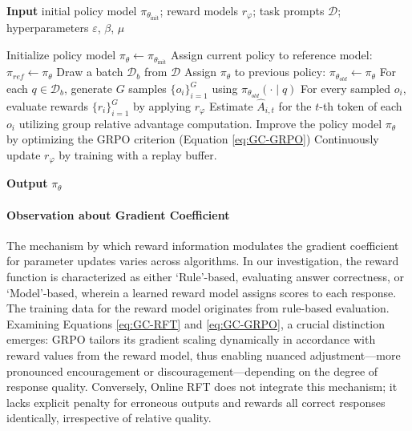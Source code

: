 \begin{algorithm}[t]
  \small
  \caption{Iterative Group Relative Policy Optimization}
  \textbf{Input} initial policy model $\pi_{\theta_{\text{init}}}$; reward models $r_\varphi$; task prompts $\mathcal{D}$; 
  hyperparameters $\varepsilon$, $\beta$, $\mu$
  \begin{algorithmic}[1]
    \State Initialize policy model $\pi_\theta \leftarrow \pi_{\theta_{\text{init}}}$
       \State Assign current policy to reference model: $\pi_{ref} \leftarrow \pi_{\theta}$
      \State Draw a batch $\mathcal{D}_b$ from $\mathcal{D}$
      \State Assign $\pi_{\theta}$ to previous policy: $\pi_{\theta_{old}} \leftarrow \pi_{\theta}$ 
      \State For each $q \in \mathcal{D}_b$, generate $G$ samples $\{o_i\}_{i=1}^G$ using $\pi_{\theta_{old}} (\cdot \mid q) $
      \State For every sampled $o_i$, evaluate rewards $\{r_i\}_{i=1}^{G}$ by applying $r_{\varphi}$ 
      \State Estimate $\hat{A}_{i,t}$ for the $t$-th token of each $o_i$ utilizing group relative advantage computation.
        \State Improve the policy model $\pi_{\theta}$ by optimizing the GRPO criterion (Equation \ref{eq:GC-GRPO})
      \EndFor
    \EndFor 
    \State Continuously update $r_\varphi$ by training with a replay buffer.
    \EndFor 
  \end{algorithmic}
  \textbf{Output} $\pi_\theta$
  \label{alg:iter-grpo}
\end{algorithm}

\paragraph{Observation about Gradient Coefficient} The mechanism by which reward information modulates the gradient coefficient for parameter updates varies across algorithms. In our investigation, the reward function is characterized as either ‘Rule’-based, evaluating answer correctness, or ‘Model’-based, wherein a learned reward model assigns scores to each response. The training data for the reward model originates from rule-based evaluation. Examining Equations \ref{eq:GC-RFT} and \ref{eq:GC-GRPO}, a crucial distinction emerges: GRPO tailors its gradient scaling dynamically in accordance with reward values from the reward model, thus enabling nuanced adjustment—more pronounced encouragement or discouragement—depending on the degree of response quality. Conversely, Online RFT does not integrate this mechanism; it lacks explicit penalty for erroneous outputs and rewards all correct responses identically, irrespective of relative quality.

